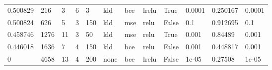 \begin{longtable}{llllllllllll}
       0.500829 &          216 &              3 &        6 &                3 &         kld &                 bce &               lrelu &      True &  0.0001 &  0.250167 &  0.0001 \\
       0.500824 &          626 &              5 &        3 &              150 &         kld &                 mse &                relu &     False &     0.1 &  0.912695 &     0.1 \\
       0.458746 &         1276 &             11 &        3 &               50 &         kld &                 mse &                relu &      True &   0.001 &   0.84489 &   0.001 \\
       0.446018 &         1636 &              7 &        4 &              150 &         kld &                 bce &                relu &     False &   0.001 &  0.448817 &   0.001 \\
              0 &         4658 &             13 &        4 &              200 &        none &                 bce &               lrelu &     False &   1e-05 &   0.27508 &   1e-05 \\
\end{longtable}
